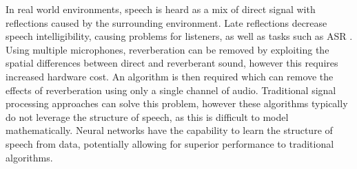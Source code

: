 \small{In real world environments, speech is heard as a mix of direct signal with reflections caused by the surrounding environment. Late reflections decrease speech intelligibility, causing problems for listeners, as well as tasks such as \ac{ASR} . Using multiple microphones, reverberation can be removed by exploiting the spatial differences between direct and reverberant sound, however this requires increased hardware cost. An algorithm is then required which can remove the effects of reverberation using only a single channel of audio. Traditional signal processing approaches can solve this problem, however these algorithms typically do not leverage the structure of speech, as this is difficult to model mathematically. Neural networks have the capability to learn the structure of speech from data, potentially allowing for superior performance to traditional algorithms.}
